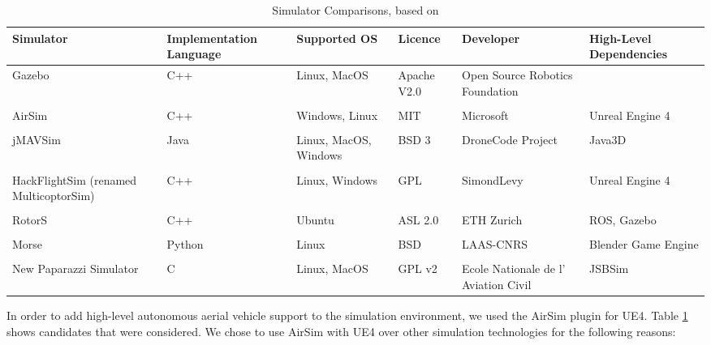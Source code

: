 



\begin{center}
\begin{table}
\footnotesize
\centering
\begin{tabular}{ p{2.1cm} p{2.2cm} p{2.1cm} p{2.1cm} p{2.1cm} p{2.1cm}} 
\hline
Simulator & Implementation Language & Supported OS & Licence & Developer & High-Level Dependencies\\
\hline
Gazebo \cite{Koenig2005DesignSimulator} & C++ & Linux, MacOS & Apache V2.0 & Open Source Robotics Foundation & \\
\\
AirSim \cite{Shah2017AirSim:Vehicles} & C++ & Windows, Linux & MIT & Microsoft & Unreal Engine 4\\ 
\\
jMAVSim \cite{jMAVSim} & Java & Linux, MacOS, Windows & BSD 3 & DroneCode Project & Java3D\\
\\
HackFlightSim (renamed MulticoptorSim) \cite{MulticopterSim} & C++ & Linux, Windows & GPL & SimondLevy & Unreal Engine 4 \\
\\
RotorS \cite{RotorS} & C++ & Ubuntu & ASL 2.0 & ETH Zurich & ROS, Gazebo\\
\\
Morse \cite{Morse} & Python & Linux & BSD & LAAS-CNRS & Blender Game Engine \\
\\
New Paparazzi Simulator \cite{NewPapSim} & C & Linux, MacOS & GPL v2 & Ecole Nationale de l’ Aviation Civil & JSBSim\\
\hline
\end{tabular}
\caption{Simulator Comparisons, based on \cite{Ebeid2018ASimulators}}
\label{table:SimulatorComparison}
\end{table}
\end{center}



In order to add high-level autonomous aerial vehicle support to the simulation environment, we used the AirSim \cite{Shah2017AirSim:Vehicles} plugin for UE4. Table \ref{table:SimulatorComparison} shows candidates that were considered. We chose to use AirSim with UE4 over other simulation technologies for the following reasons:


